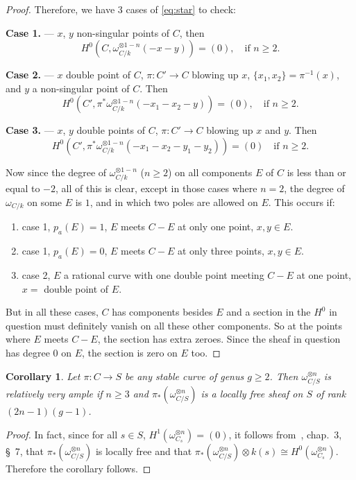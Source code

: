 \documentclass[10pt]{amsart}
\theoremstyle{plain}
\newtheorem{corollary}[theorem]{Corollary}
\theoremstyle{definition}
\begin{document}
\begin{proof}
Therefore, we have 3 cases of \eqref{eq:star} to check:

\noindent \textbf{Case 1.} --- $x$, $y$ non-singular points of $C$, then
\[
H^0(C, \omega_{C/k}^{\otimes 1-n}(-x-y)) = (0), \quad \text{if } n \geq 2.
\]

\noindent \textbf{Case 2.} --- $x$ double point of $C$, $\pi: C' \to C$ blowing up $x$, $\{x_1, x_2\} = \pi^{-1}(x)$, and $y$ a non-singular point of $C$. Then
\[
H^0(C', \pi^*\omega_{C/k}^{\otimes 1-n}(-x_1-x_2-y)) = (0), \quad \text{if } n \geq 2.
\]

\noindent \textbf{Case 3.} --- $x$, $y$ double points of $C$, $\pi: C' \to C$ blowing up $x$ and $y$. Then
\[
H^0(C', \pi^*\omega_{C/k}^{\otimes 1-n}(-x_1-x_2-y_1-y_2)) = (0) \quad \text{if } n \geq 2.
\]

Now since the degree of $\omega_{C/k}^{\otimes 1-n}$ ($n \geq 2$) on all components $E$ of $C$ is less than or equal to $-2$, all of this is clear, except in those cases where $n=2$, the degree of $\omega_{C/k}$ on some $E$ is $1$, and in which two poles are allowed on $E$. This occurs if:
\begin{enumerate}
\item[(i)] case 1, $p_a(E) = 1$, $E$ meets $C - E$ at only one point, $x, y \in E$.
\item[(ii)] case 1, $p_a(E) = 0$, $E$ meets $C - E$ at only three points, $x, y \in E$.
\item[(iii)] case 2, $E$ a rational curve with one double point meeting $C - E$ at one point, $x =$ double point of $E$.
\end{enumerate}
But in all these cases, $C$ has components besides $E$ and a section in the $H^0$ in question must definitely vanish on all these other components. So at the points where $E$ meets $C - E$, the section has extra zeroes. Since the sheaf in question has degree $0$ on $E$, the section is zero on $E$ too.
\end{proof}

\begin{corollary}
Let $\pi: C \to S$ be any stable curve of genus $g \geq 2$. Then $\omega_{C/S}^{\otimes n}$ is relatively very ample if $n \geq 3$ and $\pi_*(\omega_{C/S}^{\otimes n})$ is a locally free sheaf on $S$ of rank $(2n-1)(g-1)$.
\end{corollary}

\begin{proof}
In fact, since for all $s \in S$, $H^1(\omega_{C_s}^{\otimes n}) = (0)$, it follows from~\cite{EGA}, chap.~3, \S~7, that $\pi_*(\omega_{C/S}^{\otimes n})$ is locally free and that $\pi_*(\omega_{C/S}^{\otimes n}) \otimes k(s) \cong H^0(\omega_{C_s}^{\otimes n})$. Therefore the corollary follows.
\end{proof}
\end{document}
